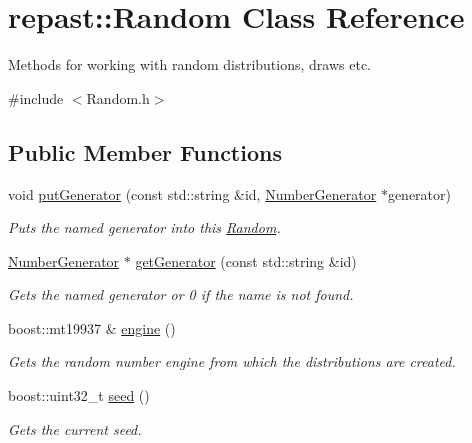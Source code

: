 \hypertarget{classrepast_1_1_random}{\section{repast\-:\-:Random Class Reference}
\label{classrepast_1_1_random}
}


Methods for working with random distributions, draws etc.  




{\ttfamily \#include $<$Random.\-h$>$}

\subsection*{Public Member Functions}
\begin{DoxyCompactItemize}
\item 
void \hyperlink{classrepast_1_1_random_af3e9c83a19e18347f05dbd0fe7044144}{put\-Generator} (const std\-::string \&id, \hyperlink{classrepast_1_1_number_generator}{Number\-Generator} $\ast$generator)
\begin{DoxyCompactList}\small\item\em Puts the named generator into this \hyperlink{classrepast_1_1_random}{Random}. \end{DoxyCompactList}\item 
\hyperlink{classrepast_1_1_number_generator}{Number\-Generator} $\ast$ \hyperlink{classrepast_1_1_random_ae74efa6b1d2a91054538378f6488b066}{get\-Generator} (const std\-::string \&id)
\begin{DoxyCompactList}\small\item\em Gets the named generator or 0 if the name is not found. \end{DoxyCompactList}\item 
boost\-::mt19937 \& \hyperlink{classrepast_1_1_random_ac3bcb79b02d9158f2d681a6887ec1f6f}{engine} ()
\begin{DoxyCompactList}\small\item\em Gets the random number engine from which the distributions are created. \end{DoxyCompactList}\item 
boost\-::uint32\-\_\-t \hyperlink{classrepast_1_1_random_abc9590ab2bbd9a61bc1af7c1f72bb604}{seed} ()
\begin{DoxyCompactList}\small\item\em Gets the current seed. \end{DoxyCompactList}\item 

\end{DoxyCompactItemize}
